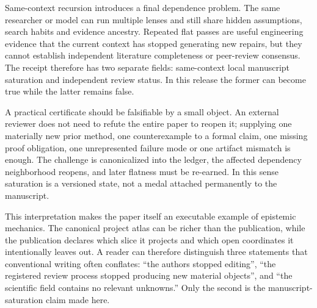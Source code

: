 Same-context recursion introduces a final dependence problem. The same researcher or model can run multiple lenses and still share hidden assumptions, search habits and evidence ancestry. Repeated flat passes are useful engineering evidence that the current context has stopped generating new repairs, but they cannot establish independent literature completeness or peer-review consensus. The receipt therefore has two separate fields: same-context local manuscript saturation and independent review status. In this release the former can become true while the latter remains false.

A practical certificate should be falsifiable by a small object. An external reviewer does not need to refute the entire paper to reopen it; supplying one materially new prior method, one counterexample to a formal claim, one missing proof obligation, one unrepresented failure mode or one artifact mismatch is enough. The challenge is canonicalized into the ledger, the affected dependency neighborhood reopens, and later flatness must be re-earned. In this sense saturation is a versioned state, not a medal attached permanently to the manuscript.

This interpretation makes the paper itself an executable example of epistemic mechanics. The canonical project atlas can be richer than the publication, while the publication declares which slice it projects and which open coordinates it intentionally leaves out. A reader can therefore distinguish three statements that conventional writing often conflates: ``the authors stopped editing'', ``the registered review process stopped producing new material objects'', and ``the scientific field contains no relevant unknowns.'' Only the second is the manuscript-saturation claim made here.
